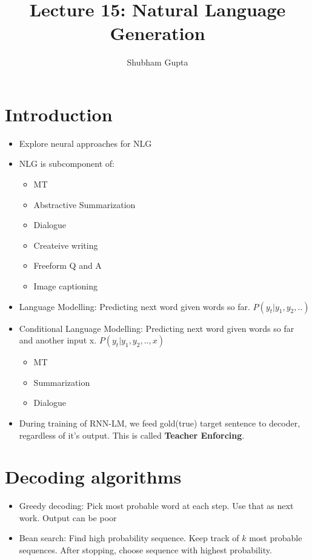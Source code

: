 \documentclass[a4paper]{article}
\title{Lecture 15: Natural Language Generation}
\author{Shubham Gupta}
\begin{document}
\maketitle
\section{Introduction}
\begin{itemize}
    \item Explore neural approaches for NLG
    \item NLG is subcomponent of:
    \begin{itemize}
        \item MT
        \item Abstractive Summarization
        \item Dialogue
        \item Createive writing
        \item Freeform Q and A
        \item Image captioning
    \end{itemize}
    \item Language Modelling: Predicting next word given words so far. $P(y_t|y_1,y_2,..)$
    \item Conditional Language Modelling: Predicting next word given words so far and another input x. $P(y_t|y_1,y_2,.., x)$
    \begin{itemize}
        \item MT
        \item Summarization
        \item Dialogue
    \end{itemize}
    \item During training of RNN-LM, we feed gold(true) target sentence to decoder, regardless of it's output. This is called \textbf{Teacher Enforcing}.  
\end{itemize}
\section{Decoding algorithms}
\begin{itemize}
    \item Greedy decoding: Pick most probable word at each step. Use that as next work. Output can be poor
    \item Bean search: Find high probability sequence. Keep track of $k$ most probable sequences. After stopping, choose sequence with highest probability. 
\end{itemize}
\end{document}
